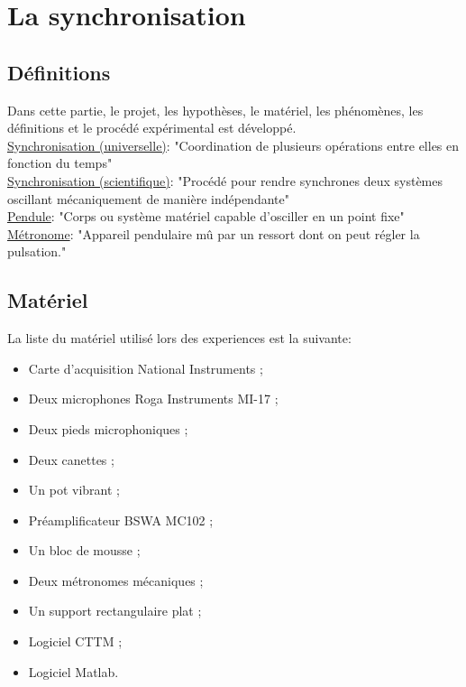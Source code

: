 \documentclass[a4paper,11pt]{report}
\begin{document}
\newpage
\null
\thispagestyle{empty}
\chapter{La synchronisation}
\section{Définitions}
Dans cette partie, le projet, les hypothèses, le matériel, les phénomènes, les définitions et le procédé expérimental est développé.\\
\underline{Synchronisation (universelle)}: "Coordination de plusieurs opérations entre elles en fonction du temps"\cite{wiki}\\
\underline{Synchronisation (scientifique)}: "Procédé pour rendre synchrones deux systèmes oscillant mécaniquement de manière indépendante"\cite{cntrl}\\
\underline{Pendule}: "Corps ou système matériel capable d'osciller en un point fixe"\cite{ikonet}\\
\underline{Métronome}: "Appareil pendulaire mû par un ressort dont on peut régler la pulsation."\cite{pend}\\

\section{Matériel}

La liste du matériel utilisé lors des experiences est la suivante:\\
\begin{itemize}[label=\textbullet, leftmargin=* ,parsep=0cm,itemsep=0cm,topsep=0cm,font=\tiny]
\item Carte d'acquisition National Instruments ;
\item Deux microphones Roga Instruments MI-17 ;
\item Deux pieds microphoniques ;
\item Deux canettes ;
\item Un pot vibrant ;
\item Préamplificateur BSWA MC102 ;
\item  Un bloc de mousse ;
\item Deux métronomes mécaniques ;
\item Un support rectangulaire plat ;
\item Logiciel CTTM ;
\item Logiciel Matlab.
\end{itemize}
\end{document}
